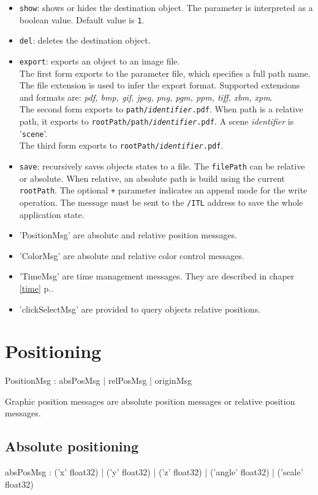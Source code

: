 \documentclass[a4paper,twoside]{report}
\newcommand{\sublevel}[1]	{\section{#1}}
\newcommand{\subsublevel}[1]	{\subsection{#1}}
\newcommand{\fullref}[1]	{\ref{#1} p.\pageref{#1}}
\newcommand{\OSC}[1]		{\texttt{#1}}
\newcommand{\values}[1]	{\texttt{#1}}
\begin{document}
\begin{itemize}
\item \OSC{show}: shows or hides the destination object. The parameter is interpreted as a boolean value. Default value is \values{1}. 
\item \OSC{del}: deletes the destination object. 
\item \OSC{export}: exports an object to an image file. \\
The first form exports to the parameter file, which specifies a full path name. The file extension is used to infer the export format. Supported extensions and formats are: \emph{pdf, bmp, gif, jpeg, png, pgm, ppm, tiff, xbm, xpm}. \\
The second form exports to \OSC{path/\textit{identifier}.pdf}. When path is a relative path, it exports to \OSC{rootPath/path/\textit{identifier}.pdf}. A scene \textit{identifier} is '\OSC{scene}'.\\
The third form exports to \OSC{rootPath/\textit{identifier}.pdf}.
\item \OSC{save}: recursively saves objects states to a file.  The \OSC{filePath} can be relative or absolute. When relative, an absolute path is build using the current \OSC{rootPath}. The optional \OSC{+} parameter indicates an append mode for the write operation. The message must be sent to the \OSC{/ITL} address to save the whole application state.
\item 'PositionMsg' are absolute and relative position messages.
\item 'ColorMsg' are absolute and relative color control messages.
\item 'TimeMsg' are time management messages. They are described in chaper \fullref{time}.
\item 'clickSelectMsg' are provided to query objects relative positions.
\end{itemize}


\sublevel{Positioning}

\begin{rail}
PositionMsg : 		absPosMsg 
				|	relPosMsg 
				|	originMsg 
\end{rail}

Graphic position messages are absolute position messages or relative position messages.

\subsublevel{Absolute positioning}

\begin{rail}
absPosMsg :  
			('x' float32)
		| 	('y' float32)
		| 	('z' float32)
		| 	('angle' float32)
		| 	('scale' float32) 
\end{rail}
\end{document}
